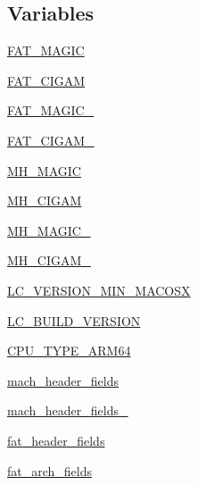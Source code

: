 \subsection*{Variables}
\begin{DoxyCompactItemize}
\item 
\hyperlink{namespacewheel_1_1macosx__libfile_a5e5f0eec61aa281eb60b6bc0f4ddd702}{F\+A\+T\+\_\+\+M\+A\+G\+IC}
\item 
\hyperlink{namespacewheel_1_1macosx__libfile_acc3eab2e6f1b1d93a3b15c2d18a89a09}{F\+A\+T\+\_\+\+C\+I\+G\+AM}
\item 
\hyperlink{namespacewheel_1_1macosx__libfile_aeeeb9242718f9ac11aa972b9d7c5a22d}{F\+A\+T\+\_\+\+M\+A\+G\+I\+C\+\_}
\item 
\hyperlink{namespacewheel_1_1macosx__libfile_a2f86a9c3f32a610f34099c75635c9216}{F\+A\+T\+\_\+\+C\+I\+G\+A\+M\+\_}
\item 
\hyperlink{namespacewheel_1_1macosx__libfile_a7e3c23de9c2c7b83c3b5277016961093}{M\+H\+\_\+\+M\+A\+G\+IC}
\item 
\hyperlink{namespacewheel_1_1macosx__libfile_ae9a8250885ec699867715a5f6be97eac}{M\+H\+\_\+\+C\+I\+G\+AM}
\item 
\hyperlink{namespacewheel_1_1macosx__libfile_ab816d57f18166910e6c2bb8c3dcf9453}{M\+H\+\_\+\+M\+A\+G\+I\+C\+\_}
\item 
\hyperlink{namespacewheel_1_1macosx__libfile_a4286577b2bc4a8924980378a6c296d3d}{M\+H\+\_\+\+C\+I\+G\+A\+M\+\_}
\item 
\hyperlink{namespacewheel_1_1macosx__libfile_a9bb0eed339fc862ff460ff8f0d7a99cd}{L\+C\+\_\+\+V\+E\+R\+S\+I\+O\+N\+\_\+\+M\+I\+N\+\_\+\+M\+A\+C\+O\+SX}
\item 
\hyperlink{namespacewheel_1_1macosx__libfile_a9348f8df7d46d5b78d14d1198a1d02d8}{L\+C\+\_\+\+B\+U\+I\+L\+D\+\_\+\+V\+E\+R\+S\+I\+ON}
\item 
\hyperlink{namespacewheel_1_1macosx__libfile_a4e8989d39e2dc71f8db2f0649b5e939d}{C\+P\+U\+\_\+\+T\+Y\+P\+E\+\_\+\+A\+R\+M64}
\item 
\hyperlink{namespacewheel_1_1macosx__libfile_a1ca476b33bb616d702b043ddfd6a88b3}{mach\+\_\+header\+\_\+fields}
\item 
\hyperlink{namespacewheel_1_1macosx__libfile_a567b12a38f968df262497a284194e011}{mach\+\_\+header\+\_\+fields\+\_}
\item 
\hyperlink{namespacewheel_1_1macosx__libfile_a07495270531e858a213c32a88a9902a3}{fat\+\_\+header\+\_\+fields}
\item 
\hyperlink{namespacewheel_1_1macosx__libfile_ac8f15e776e1e55d7032a0e7b89c48590}{fat\+\_\+arch\+\_\+fields}

\end{DoxyCompactItemize}
